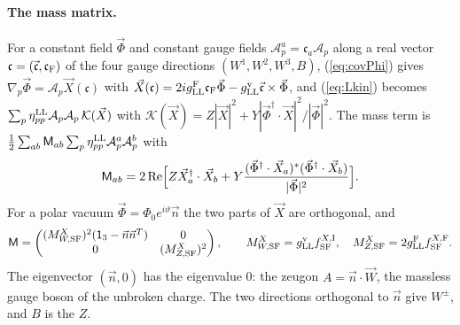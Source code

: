 \documentclass[aps,prd,onecolumn,superscriptaddress,nofootinbib,floatfix,longbibliography]{revtex4-2}
\newcommand{\LL}{{\rm LL}}
\newcommand{\SF}{{\rm SF}}
\begin{document}
\paragraph*{The mass matrix.}
For a constant field $\vec\Phi$ and constant gauge fields $\mathcal A^a_p=\mathfrak c_a\mathcal A_p$ along a real vector
$\mathfrak c=(\vec{\mathfrak c},\mathfrak c_{\rm F})$ of the four gauge directions $(W^1,W^2,W^3,B)$, (\ref{eq:covPhi}) gives
$\nabla_p\vec\Phi=\mathcal A_p\vec X(\mathfrak c)$ with $\vec X(\mathfrak c)=2ig^{\rm F}_\LL\mathfrak c_{\rm F}\vec\Phi-g^{\rm v}_\LL\vec{\mathfrak c}\times\vec\Phi$, and
(\ref{eq:Lkin}) becomes $\sum_p\eta^\LL_{pp}\mathcal A_p\mathcal A_p\,\mathcal K(\vec X)$ with
$\mathcal K(\vec X)=Z|\vec X|^2+Y|\vec\Phi^\dagger\cdot\vec X|^2/|\vec\Phi|^2$. The mass term is
$\frac12\sum_{ab}\mathsf M_{ab}\sum_p\eta^\LL_{pp}\mathcal A^a_p\mathcal A^b_p$ with
\begin{equation}
\mathsf M_{ab}=2\,{\rm Re}\Big[Z\vec X_a^\dagger\cdot\vec X_b+Y\frac{(\vec\Phi^\dagger\cdot\vec X_a)^*(\vec\Phi^\dagger\cdot\vec X_b)}{|\vec\Phi|^2}\Big].
\label{eq:massmatrix}
\end{equation}
For a polar vacuum $\vec\Phi=\Phi_0e^{i\vartheta}\vec n$ the two parts of $\vec X$ are orthogonal, and
\begin{equation}
\mathsf M=\begin{pmatrix}(M^X_{W,\SF})^2(\mathsf 1_3-\vec n\vec n^T)&0\\0&(M^X_{Z,\SF})^2\end{pmatrix},\qquad
M^X_{W,\SF}=g^{\rm v}_\LL f^{X,{\rm I}}_\SF,\quad M^X_{Z,\SF}=2g^{\rm F}_\LL f^{X,{\rm F}}_\SF .
\label{eq:MWMZ}
\end{equation}
The eigenvector $(\vec n,0)$ has the eigenvalue 0: the zeugon $A=\vec n\cdot\vec W$, the massless gauge boson of the unbroken charge. The two directions orthogonal to $\vec n$ give
$W^\pm$, and $B$ is the $Z$.
\end{document}
